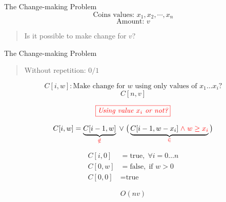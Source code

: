 
\begin{frame}{}
  \begin{exampleblock}{The Change-making Problem}
    \[
      \text{Coins values: } x_{1}, x_{2}, \cdots, x_{n}
    \]
    \[
      \text{Amount: } v
    \]

    \vspace{0.30cm}
    \begin{quote}
      \centering
      Is it possible to make change for $v$?
    \end{quote}
  \end{exampleblock}

\end{frame}

\begin{frame}{}
  \begin{exampleblock}{The Change-making Problem}
    \begin{quote}
      \centering
      Without repetition: $0/1$
    \end{quote}
  \end{exampleblock}

  \pause
  \[
    C[i, w]: \text{Make change for $w$ using only values of $x_{1} \dots x_{i}$?}
  \]
  \[
    C[n,v]
  \]

  \pause
  \[
    \textcolor{red}{\fbox{\it Using value $x_{i}$ or not?}}
  \]

  \[
    C[i,w] = \underbrace{C[i-1, w]}_{\textcolor{red}{\notin}} \;\lor\; \big(\underbrace{C[i-1, w-x_{i}] \textcolor{red}{\;\land\; w \ge x_{i}}}_{\textcolor{red}{\in}}\big)
  \]

  \pause
  \begin{align*}
    C[i,0] &= \text{true},  \; \forall i = 0 \dots n  \\
    C[0,w] &= \text{false}, \;\text{if } w > 0 \\
    C[0,0] &= \text{true}
  \end{align*}
  
  \[
    O(nv)
  \]
\end{frame}

